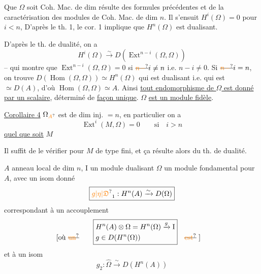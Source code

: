 Que $\Omega$ soit Coh. Mac. de dim résulte des
formules précédentes et de la caractérisation des modules
de Coh. Mac. de dim $n$. Il s'ensuit
$H^i(\Omega)=0$ pour $i<n$,  D'après le th. 1,
le cor. 1 implique que $H^n(\Omega)$ est dualisant.

D'après le th. de dualité, on a
\[
H^i(\Omega)\xrightarrow{\sim}D(\operatorname{Ext}^{n-i}(\Omega,\Omega))
\]
-- qui montre que 
$\operatorname{Ext}^{n-i}(\Omega,\Omega)=0$ si $\deleted{\unsure{n-}}i\ne n$ i.e. $n-i\ne0$.
 Si $\deleted{\unsure{n-}}i=n$, on
trouve $D(\operatorname{Hom}(\Omega,\Omega))\simeq H^n(\Omega)$ qui est
dualisant i.e. qui est $\simeq D(A)$, d'où
$\operatorname{Hom}(\Omega,\Omega)\simeq A$. Ainsi \uline{tout endomorphisme
de $\Omega$ est donné par un scalaire}, déterminé de
\uline{façon unique}.  $\Omega$ \uline{est  un module fidèle}.

\uline{Corollaire 4}  $\Omega_{\unsure{A}}$ est de dim inj. $=n$, en
particulier on a
\[
\operatorname{Ext}^i(M,\Omega)=0\qquad\text{si}\quad i>n
\]
\uline{quel que soit} $M$

Il suffit de le vérifier pour $M$ de
type fini, et ça résulte alors du th. de dualité.


$A$ anneau local de dim $n$, $\mathrm I$ un module dualisant
$\Omega$ un module fondamental pour $A$, avec un isom donné
\[
\boxed{\unsure{g|\eta|\mathfrak D}_1:H^n(A)\xrightarrow{\sim}D(\Omega)}
\]
correspondant à un accouplement
\[
\begin{aligned}[b]&\text{[où \deleted{\unsure{un}}}\end{aligned}\quad
\boxed{\begin{aligned}[b]
&H^n(A)\otimes\Omega=H^n(\Omega)\xrightarrow{g}\mathrm I\\
&g\in D(H^n(\Omega))
\end{aligned}}\quad\begin{aligned}[b]&\text{\deleted{\unsure{est}} ]}\end{aligned}
\]
et à un isom
\[
g_2:\widehat\Omega\xrightarrow{\sim}D(H^n(A))
\]

